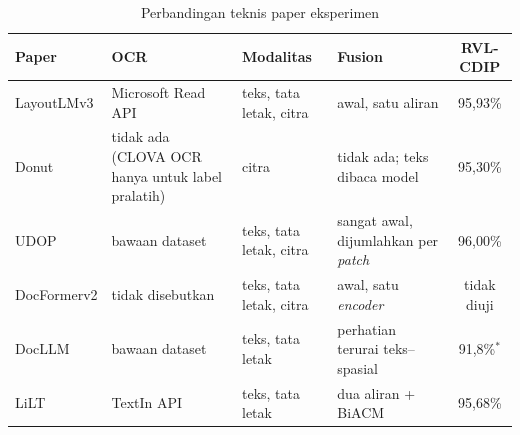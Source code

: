 \begin{table}[H]
  \centering
  \caption{Perbandingan teknis paper eksperimen}
  \label{tab:banding}
  \fontsize{9}{11}\selectfont
  \begin{tabularx}{\textwidth}{|l|>{\raggedright\arraybackslash}X|>{\raggedright\arraybackslash}X|>{\raggedright\arraybackslash}X|c|}
    \hline
    \textbf{Paper} & \textbf{OCR} & \textbf{Modalitas} & \textbf{Fusion} &
    \textbf{RVL-CDIP} \\ \hline
    LayoutLMv3 & Microsoft Read API & teks, tata letak, citra &
    awal, satu aliran & 95,93\% \\ \hline
    Donut & tidak ada (CLOVA OCR hanya untuk label pralatih) & citra &
    tidak ada; teks dibaca model & 95,30\% \\ \hline
    UDOP & bawaan dataset & teks, tata letak, citra &
    sangat awal, dijumlahkan per \textit{patch} & 96,00\% \\ \hline
    DocFormerv2 & tidak disebutkan & teks, tata letak, citra &
    awal, satu \textit{encoder} & tidak diuji \\ \hline
    DocLLM & bawaan dataset & teks, tata letak &
    perhatian terurai teks--spasial & 91,8\%$^\ast$ \\ \hline
    LiLT & TextIn API & teks, tata letak & dua aliran + BiACM & 95,68\% \\ \hline
  \end{tabularx}
\end{table}

